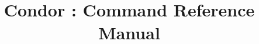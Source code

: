 \documentclass[titlepage]{article}
\begin{document}
%
%



%
%
\title{Condor \VersionNotice: Command Reference Manual}
\author{\AuthorNotice}
\maketitle
\latex{\tableofcontents}


\end{document}

